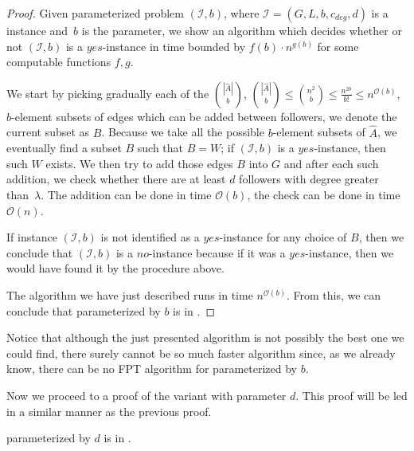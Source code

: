 \begin{proof}
    Given parameterized problem $(\mathcal{I}, b)$, where $\mathcal{I} = (G, L, b, c_{deg}, d)$ is a \HLdeg instance
    and~$b$ is the parameter,
    we show an algorithm which decides whether or not $(\mathcal{I}, b)$ is a $yes$-instance in time bounded by
    $f(b) \cdot n^{g(b)}$ for some computable functions $f,g$.

    We start by picking gradually each of the $\binom{|\hat{A}|}{b}$,
    $\binom{|\hat{A}|}{b} \leq \binom{n^2}{b} \leq \frac{n^{2b}}{b!} \leq n^{\mathcal{O}(b)}$,
    $b$-element subsets of edges which can be added between followers, we denote the current subset as $B$.
    Because we take all the possible $b$-element subsets of $\hat{A}$,
    we eventually find a subset $B$ such that $B = W$;
    if $(\mathcal{I}, b)$ is a $yes$-instance, then such $W$ exists.
    We then try to add those edges $B$ into $G$ and after each such addition,
    we check whether there are at least $d$ followers
    with degree greater than~$\lambda$.
    The addition can be done in time $\mathcal{O}(b)$, the check can be done in time $\mathcal{O}(n)$.

    If instance $(\mathcal{I}, b)$ is not identified as a $yes$-instance for any choice of $B$,
    then we conclude that $(\mathcal{I}, b)$ is a $no$-instance because if it was a $yes$-instance,
    then we would have found it by the procedure above.

    The algorithm we have just described runs in time $n^{\mathcal{O}(b)}$.
    From this, we can conclude that \HL parameterized by $b$ is in \XP.
\end{proof}

Notice that although the just presented algorithm is not possibly the best one we could find,
there surely cannot be so much faster algorithm since, as we already know,
there can be no FPT algorithm for \HL parameterized by $b$.


Now we proceed to a proof of the variant with parameter $d$.
This proof will be led in a similar manner as the previous proof.

\begin{theorem}\label{theorem:D:XP}
    \HL parameterized by $d$ is in \XP.
\end{theorem}

